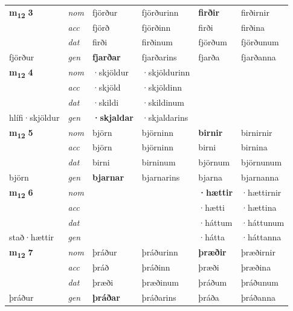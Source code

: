 \begin{longtable}[l]{X>{\footnotesize\itshape}XXXXX}
\multirow{3}{*}{{{\textbf{m{\textsubscript{12}}} \Large{\textbf{3}}}}} & nom & fjörður & fjörðurinn & \textbf{firðir} & firðirnir \\*
 & acc & fjörð & fjörðinn & firði & firðina \\*
 & dat & firði & firðinum & fjörðum & fjörðunum \\*
 {\footnotesize{fjörður}} & gen & \textbf{fjarðar} & fjarðarins & fjarða & fjarðanna \\
\cmidrule{1-6}

\multirow{3}{*}{{{\textbf{m{\textsubscript{12}}} \Large{\textbf{4}}}}} & nom & ·skjöldur & ·skjöldurinn & \textbf{} &  \\*
 & acc & ·skjöld & ·skjöldinn &  &  \\*
 & dat & ·skildi & ·skildinum &  &  \\*
 {\footnotesize{hlífi\allowbreak ·skjöldur}} & gen & \textbf{·skjaldar} & ·skjaldarins &  &  \\
\cmidrule{1-6}

\multirow{3}{*}{{{\textbf{m{\textsubscript{12}}} \Large{\textbf{5}}}}} & nom & björn & björninn & \textbf{birnir} & birnirnir \\*
 & acc & björn & björninn & birni & birnina \\*
 & dat & birni & birninum & björnum & björnunum \\*
 {\footnotesize{björn}} & gen & \textbf{bjarnar} & bjarnarins & bjarna & bjarnanna \\
\cmidrule{1-6}

\multirow{3}{*}{{{\textbf{m{\textsubscript{12}}} \Large{\textbf{6}}}}} & nom &  &  & \textbf{·hættir} & ·hættirnir \\*
 & acc &  &  & ·hætti & ·hættina \\*
 & dat &  &  & ·háttum & ·háttunum \\*
 {\footnotesize{stað\allowbreak ·hættir}} & gen & \textbf{} &  & ·hátta & ·háttanna \\
\cmidrule{1-6}

\multirow{3}{*}{{{\textbf{m{\textsubscript{12}}} \Large{\textbf{7}}}}} & nom & þráður & þráðurinn & \textbf{þræðir} & þræðirnir \\*
 & acc & þráð & þráðinn & þræði & þræðina \\*
 & dat & þræði & þræðinum & þráðum & þráðunum \\*
 {\footnotesize{þráður}} & gen & \textbf{þráðar} & þráðarins & þráða & þráðanna \\
\cmidrule{1-6}


\end{longtable}
